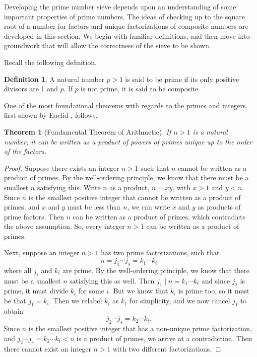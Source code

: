 \documentclass{amsart}
\newtheorem{thm}{Theorem}
\theoremstyle{definition}
\newtheorem{definition}{Definition}[section]
\theoremstyle{case}
\begin{document}
	
	Developing the prime number sieve depends upon an understanding of some important properties of prime numbers. The ideas of checking up to the square root of a number for factors and unique factorizations of composite numbers are developed in this section. We begin with familiar definitions, and then move into groundwork that will allow the correctness of the sieve to be shown.

	Recall the following definition.
	\begin{definition}
		A natural number $p>1$ is said to be prime if its only positive divisors are 1 and $p$. If $p$ is not prime, it is said to be composite.
	\end{definition}
	
	One of the most foundational theorems with regards to the primes and integers, first shown by Euclid \cite{MR605273}, follows.
	\begin{thm}[Fundamental Theorem of Arithmetic]\label{arith}
		If $n > 1$ is a natural number, it can be written as a product of powers of primes unique up to the order of the factors.
	\end{thm}
	\begin{proof}
		Suppose there exists an integer $n>1$ such that $n$ cannot be written as a product of primes. By the well-ordering principle, we know that there must be a smallest $n$ satisfying this. Write $n$ as a product, $n = xy$, with $x>1$ and $y<n$. Since $n$ is the smallest positive integer that cannot be written as a product of primes, and $x$ and $y$ must be less than $n$, we can write $x$ and $y$ as products of prime factors. Then $n$ can be written as a product of primes, which contradicts the above assumption. So, every integer $n>1$ can be written as a product of primes.
		
		Next, suppose an integer $n>1$ has two prime factorizations, such that
		$$ n = j_1 \cdots j_s = k_1 \cdots k_t $$
		where all $j_i$ and $k_i$ are prime. By the well-ordering principle, we know that there must be a smallest $n$ satisfying this as well. Then $j_1 \mid n = k_1 \cdots k_t$ and since $j_1$ is prime, it must divide $k_i$ for some $i$. But we know that $k_i$ is prime too, so it must be that $j_1 = k_i$. Then we relabel $k_i$ as $k_1$ for simplicity, and we now cancel $j_1$ to obtain
		$$ j_2 \cdots j_s = k_2 \cdots k_t . $$
		Since $n$ is the smallest positive integer that has a non-unique prime factorization, and $ j_2 \cdots j_s = k_2 \cdots k_t < n $ is a product of primes, we arrive at a contradiction. Then there cannot exist an integer $n>1$ with two different factorizations.
	\end{proof}
\end{document}
